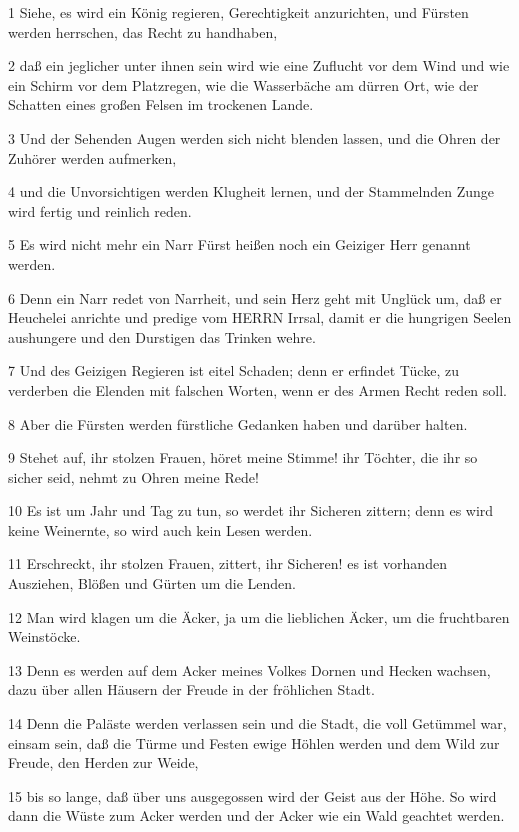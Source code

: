 \par 1 Siehe, es wird ein König regieren, Gerechtigkeit anzurichten, und Fürsten werden herrschen, das Recht zu handhaben,
\par 2 daß ein jeglicher unter ihnen sein wird wie eine Zuflucht vor dem Wind und wie ein Schirm vor dem Platzregen, wie die Wasserbäche am dürren Ort, wie der Schatten eines großen Felsen im trockenen Lande.
\par 3 Und der Sehenden Augen werden sich nicht blenden lassen, und die Ohren der Zuhörer werden aufmerken,
\par 4 und die Unvorsichtigen werden Klugheit lernen, und der Stammelnden Zunge wird fertig und reinlich reden.
\par 5 Es wird nicht mehr ein Narr Fürst heißen noch ein Geiziger Herr genannt werden.
\par 6 Denn ein Narr redet von Narrheit, und sein Herz geht mit Unglück um, daß er Heuchelei anrichte und predige vom HERRN Irrsal, damit er die hungrigen Seelen aushungere und den Durstigen das Trinken wehre.
\par 7 Und des Geizigen Regieren ist eitel Schaden; denn er erfindet Tücke, zu verderben die Elenden mit falschen Worten, wenn er des Armen Recht reden soll.
\par 8 Aber die Fürsten werden fürstliche Gedanken haben und darüber halten.
\par 9 Stehet auf, ihr stolzen Frauen, höret meine Stimme! ihr Töchter, die ihr so sicher seid, nehmt zu Ohren meine Rede!
\par 10 Es ist um Jahr und Tag zu tun, so werdet ihr Sicheren zittern; denn es wird keine Weinernte, so wird auch kein Lesen werden.
\par 11 Erschreckt, ihr stolzen Frauen, zittert, ihr Sicheren! es ist vorhanden Ausziehen, Blößen und Gürten um die Lenden.
\par 12 Man wird klagen um die Äcker, ja um die lieblichen Äcker, um die fruchtbaren Weinstöcke.
\par 13 Denn es werden auf dem Acker meines Volkes Dornen und Hecken wachsen, dazu über allen Häusern der Freude in der fröhlichen Stadt.
\par 14 Denn die Paläste werden verlassen sein und die Stadt, die voll Getümmel war, einsam sein, daß die Türme und Festen ewige Höhlen werden und dem Wild zur Freude, den Herden zur Weide,
\par 15 bis so lange, daß über uns ausgegossen wird der Geist aus der Höhe. So wird dann die Wüste zum Acker werden und der Acker wie ein Wald geachtet werden.
